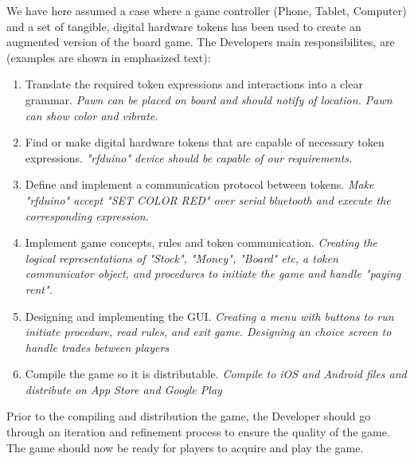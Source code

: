 We have here assumed a case where a game controller (Phone, Tablet, Computer) and a set of tangible, digital hardware tokens has been used to create an augmented version of the board game. The Developers main responsibilites, are (examples are shown in emphasized text):
\begin{enumerate} \label{develop_cycle}
\item Translate the required token expressions and interactions into a clear grammar. \emph{Pawn can be placed on board and should notify of location. Pawn can show color and vibrate.}
\item Find or make digital hardware tokens that are capable of necessary token expressions. \emph{"rfduino" device should be capable of our requirements.}
\item Define and implement a communication protocol between tokens. \emph{Make "rfduino" accept "SET COLOR RED" over serial bluetooth and execute the corresponding expression.}
\item Implement game concepts, rules and token communication. \emph{Creating the logical representations of "Stock", "Money", "Board" etc, a token communicator object, and procedures to initiate the game and handle "paying rent".}
\item Designing and implementing the GUI. \emph{Creating a menu with buttons to run initiate procedure, read rules, and exit game. Designing an choice screen to handle trades between players}
\item Compile the game so it is distributable. \emph{Compile to iOS and Android files and distribute on App Store and Google Play}
\end{enumerate}
Prior to the compiling and distribution the game, the Developer should go through an iteration and refinement process to ensure the quality of the game. The game should now be ready for players to acquire and play the game.

